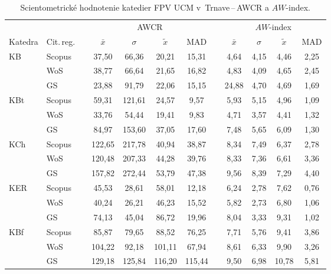 \begin{table}
  \centering\small
  \caption[Hodnotenie FPV\,--\,AWCR a $AW$-index]%
  {Scientometrické hodnotenie katedier FPV UCM v~Trnave\,--\,AWCR a $AW$-index.}
  \label{tab:5-staff.results}
  \begin{tabularx}{\textwidth}{XXp{0.2ex}ccccp{0.2ex}cccc}
    \toprule
    & & & \multicolumn{4}{c}{AWCR} & & \multicolumn{4}{c}{$AW$-index} \\
    \cmidrule{4-7}\cmidrule{9-12}
    Katedra & Cit.\,reg. & & $\bar{x}$ & $\sigma$ & $\tilde{x}$ & MAD & & $\bar{x}$ & $\sigma$ & $\tilde{x}$ & MAD \\[0.3ex]
    \midrule
    KB   & Scopus & & 37,50  & 66,36  & 20,21  & 15,31  & & 4,64  & 4,15 & 4,46  & 2,25 \\
         & WoS    & & 38,77  & 66,64  & 21,65  & 16,82  & & 4,83  & 4,09 & 4,65  & 2,45 \\
         & GS     & & 23,88  & 91,79  & 22,06  & 15,15  & & 24,88 & 4,70 & 4,69  & 1,69 \\[1ex]
    KBt  & Scopus & & 59,31  & 121,61 & 24,57  & 9,57   & & 5,93  & 5,15 & 4,96  & 1,09 \\
         & WoS    & & 33,76  & 54,44  & 19,41  & 9,83   & & 4,71  & 3,57 & 4,41  & 1,32 \\
         & GS     & & 84,97  & 153,60 & 37,05  & 17,60  & & 7,48  & 5,65 & 6,09  & 1,30 \\[1ex]
    KCh  & Scopus & & 122,65 & 217,78 & 40,94  & 38,87  & & 8,34  & 7,49 & 6,37  & 2,78 \\
         & WoS    & & 120,48 & 207,33 & 44,28  & 39,76  & & 8,33  & 7,36 & 6,61  & 3,36 \\
         & GS     & & 157,82 & 272,44 & 53,79  & 47,38  & & 9,56  & 8,39 & 7,29  & 4,40 \\[1ex]
    KER  & Scopus & & 45,53  & 28,61  & 58,01  & 12,18  & & 6,24  & 2,78 & 7,62  & 0,76 \\
         & WoS    & & 40,24  & 26,21  & 46,23  & 15,52  & & 5,82  & 2,73 & 6,80  & 1,06 \\
         & GS     & & 74,13  & 45,04  & 86,72  & 19,96  & & 8,04  & 3,33 & 9,31  & 1,02 \\[1ex]
    KBf  & Scopus & & 85,87  & 79,65  & 88,52  & 76,25  & & 7,71  & 5,76 & 9,41  & 3,86 \\
         & WoS    & & 104,22 & 92,18  & 101,11 & 67,94  & & 8,61  & 6,33 & 9,90  & 3,26 \\
         & GS     & & 129,18 & 125,84 & 116,20 & 115,44 & & 9,50  & 6,98 & 10,78 & 5,81 \\[1ex]

\end{tabularx}
\end{table}
